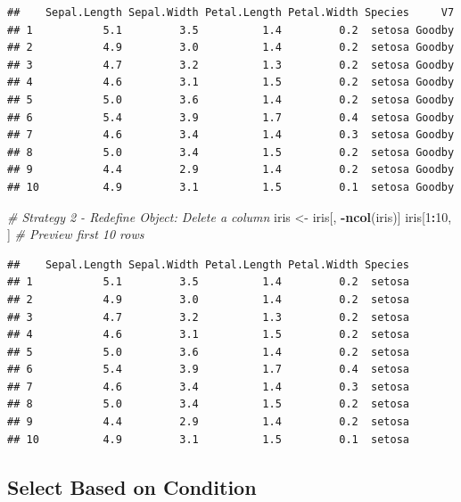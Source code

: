 \documentclass[
]{book}
\newenvironment{Shaded}{\begin{snugshade}}{\end{snugshade}}
\newcommand{\CommentTok}[1]{\textcolor[rgb]{0.56,0.35,0.01}{\textit{#1}}}
\newcommand{\DecValTok}[1]{\textcolor[rgb]{0.00,0.00,0.81}{#1}}
\newcommand{\KeywordTok}[1]{\textcolor[rgb]{0.13,0.29,0.53}{\textbf{#1}}}
\newcommand{\NormalTok}[1]{#1}
\newcommand{\OperatorTok}[1]{\textcolor[rgb]{0.81,0.36,0.00}{\textbf{#1}}}
\newcommand{\StringTok}[1]{\textcolor[rgb]{0.31,0.60,0.02}{#1}}
\begin{document}
\begin{verbatim}
##    Sepal.Length Sepal.Width Petal.Length Petal.Width Species     V7
## 1           5.1         3.5          1.4         0.2  setosa Goodby
## 2           4.9         3.0          1.4         0.2  setosa Goodby
## 3           4.7         3.2          1.3         0.2  setosa Goodby
## 4           4.6         3.1          1.5         0.2  setosa Goodby
## 5           5.0         3.6          1.4         0.2  setosa Goodby
## 6           5.4         3.9          1.7         0.4  setosa Goodby
## 7           4.6         3.4          1.4         0.3  setosa Goodby
## 8           5.0         3.4          1.5         0.2  setosa Goodby
## 9           4.4         2.9          1.4         0.2  setosa Goodby
## 10          4.9         3.1          1.5         0.1  setosa Goodby
\end{verbatim}

\begin{Shaded}
\begin{Highlighting}[]
\CommentTok{# Strategy 2 - Redefine Object: Delete a column}
\NormalTok{iris <-}\StringTok{ }\NormalTok{iris[, }\OperatorTok{-}\KeywordTok{ncol}\NormalTok{(iris)]}
\NormalTok{iris[}\DecValTok{1}\OperatorTok{:}\DecValTok{10}\NormalTok{, ]  }\CommentTok{# Preview first 10 rows }
\end{Highlighting}
\end{Shaded}

\begin{verbatim}
##    Sepal.Length Sepal.Width Petal.Length Petal.Width Species
## 1           5.1         3.5          1.4         0.2  setosa
## 2           4.9         3.0          1.4         0.2  setosa
## 3           4.7         3.2          1.3         0.2  setosa
## 4           4.6         3.1          1.5         0.2  setosa
## 5           5.0         3.6          1.4         0.2  setosa
## 6           5.4         3.9          1.7         0.4  setosa
## 7           4.6         3.4          1.4         0.3  setosa
## 8           5.0         3.4          1.5         0.2  setosa
## 9           4.4         2.9          1.4         0.2  setosa
## 10          4.9         3.1          1.5         0.1  setosa
\end{verbatim}

\hypertarget{select-based-on-condition}{%
\subsection{Select Based on Condition}\label{select-based-on-condition}}
\end{document}
